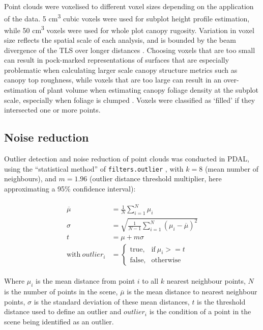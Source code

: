 \begin{refsection}
Point clouds were voxelised to different voxel sizes depending on the application of the data. 5 cm\textsuperscript{3} cubic voxels were used for subplot height profile estimation, while 50 cm\textsuperscript{3} voxels were used for whole plot canopy rugosity. Variation in voxel size reflects the spatial scale of each analysis, and is bounded by the beam divergence of the TLS over longer distances \citep{Grau2017}. Choosing voxels that are too small can result in pock-marked representations of surfaces that are especially problematic when calculating larger scale canopy structure metrics such as canopy top roughness, while voxels that are too large can result in an over-estimation of plant volume when estimating canopy foliage density at the subplot scale, especially when foliage is clumped \citep{Seidel2012, Cifuentes2014}. Voxels were classified as `filled' if they intersected one or more points. 

\subsection{Noise reduction}
\label{workflow:ssec:noise}

Outlier detection and noise reduction of point clouds was conducted in PDAL, using the ``statistical method'' of \texttt{filters.outlier} \citep{Rusu2008}, with $k = 8$ (mean number of neighbours), and $m = 1.96$ (outlier distance threshold multiplier, here approximating a 95\% confidence interval):

\begin{align}
\begin{split}
	\overline{\mu} &= \frac{1}{N} \sum_{i=1}^{N} \mu_{i} \\
	\sigma &= \sqrt{\frac{1}{N-1} \sum_{i=1}^{N}(\mu_{i} - \overline{\mu{}})^2} \\
	t &= \mu + m \sigma \\
	\text{with}\ outlier_{i} &= 
		\begin{cases}
			\text{true},& \text{if}\ \mu_{i} >= t \\
			\text{false},& \text{otherwise}
		\end{cases}
\end{split}
\end{align}

Where $\mu_{i}$ is the mean distance from point $i$ to all $k$ nearest neighbour points, $N$ is the number of points in the scene, $\overline{\mu}$ is the mean distance to nearest neighbour points, $\sigma$ is the standard deviation of these mean distances, $t$ is the threshold distance used to define an outlier and $outlier_{i}$ is the condition of a point in the scene being identified as an outlier.


\end{refsection}
